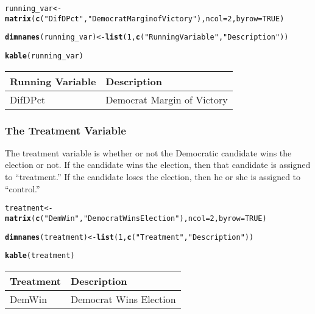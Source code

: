 \documentclass[11pt,leqno]{article}\usepackage[]{graphicx}\usepackage[]{color}
\makeatletter
\newcommand{\hlnum}[1]{\textcolor[rgb]{0.686,0.059,0.569}{#1}}%
\newcommand{\hlstr}[1]{\textcolor[rgb]{0.192,0.494,0.8}{#1}}%
\newcommand{\hlstd}[1]{\textcolor[rgb]{0.345,0.345,0.345}{#1}}%
\newcommand{\hlkwb}[1]{\textcolor[rgb]{0.69,0.353,0.396}{#1}}%
\newcommand{\hlkwc}[1]{\textcolor[rgb]{0.333,0.667,0.333}{#1}}%
\newcommand{\hlkwd}[1]{\textcolor[rgb]{0.737,0.353,0.396}{\textbf{#1}}}%
\newenvironment{kframe}{%
 \def\at@end@of@kframe{}%
 \ifinner\ifhmode%
  \def\at@end@of@kframe{\end{minipage}}%
  \begin{minipage}{\columnwidth}%
 \fi\fi%
 \def\FrameCommand##1{\hskip\@totalleftmargin \hskip-\fboxsep
 \colorbox{shadecolor}{##1}\hskip-\fboxsep
     \hskip-\linewidth \hskip-\@totalleftmargin \hskip\columnwidth}%
 \MakeFramed {\advance\hsize-\width
   \@totalleftmargin\z@ \linewidth\hsize
   \@setminipage}}%
 {\par\unskip\endMakeFramed%
 \at@end@of@kframe}
\newenvironment{knitrout}{}{} %
\theoremstyle{newstyle}
\makeatother
\begin{document}
\begin{knitrout}\footnotesize
{}\color{fgcolor}\begin{kframe}
\begin{alltt}
\hlstd{running_var} \hlkwb{<-} \hlkwd{matrix}\hlstd{(}\hlkwd{c}\hlstd{(}\hlstr{"DifDPct"}\hlstd{,} \hlstr{"Democrat Margin of Victory"}\hlstd{),} \hlkwc{ncol} \hlstd{=} \hlnum{2}\hlstd{,} \hlkwc{byrow} \hlstd{=} \hlnum{TRUE}\hlstd{)}

\hlkwd{dimnames}\hlstd{(running_var)} \hlkwb{<-} \hlkwd{list}\hlstd{(}\hlnum{1}\hlstd{,} \hlkwd{c}\hlstd{(}\hlstr{"Running Variable"}\hlstd{,} \hlstr{"Description"}\hlstd{))}

\hlkwd{kable}\hlstd{(running_var)}
\end{alltt}
\end{kframe}
\begin{tabular}{l|l}
\hline
Running Variable & Description\\
\hline
DifDPct & Democrat Margin of Victory\\
\hline
\end{tabular}


\end{knitrout}

\subsubsection{The Treatment Variable}

The treatment variable is whether or not the Democratic candidate wins the election or not. If the candidate wins the election, then that candidate is assigned to ``treatment.'' If the candidate loses the election, then he or she is assigned to ``control.''

\begin{knitrout}\footnotesize
{}\color{fgcolor}\begin{kframe}
\begin{alltt}
\hlstd{treatment} \hlkwb{<-} \hlkwd{matrix}\hlstd{(}\hlkwd{c}\hlstd{(}\hlstr{"DemWin"}\hlstd{,} \hlstr{"Democrat Wins Election"}\hlstd{),} \hlkwc{ncol} \hlstd{=} \hlnum{2}\hlstd{,} \hlkwc{byrow} \hlstd{=} \hlnum{TRUE}\hlstd{)}

\hlkwd{dimnames}\hlstd{(treatment)} \hlkwb{<-} \hlkwd{list}\hlstd{(}\hlnum{1}\hlstd{,} \hlkwd{c}\hlstd{(}\hlstr{"Treatment"}\hlstd{,} \hlstr{"Description"}\hlstd{))}

\hlkwd{kable}\hlstd{(treatment)}
\end{alltt}
\end{kframe}
\begin{tabular}{l|l}
\hline
Treatment & Description\\
\hline
DemWin & Democrat Wins Election\\
\hline
\end{tabular}


\end{knitrout}
\end{document}
